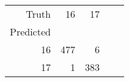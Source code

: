 \begin{tabular}{rrrrr}
\toprule
Truth & 16 & 17 \\
Predicted &  &  \\
\midrule
16 & 477 & 6 \\
17 & 1 & 383 \\
\bottomrule
\end{tabular}

